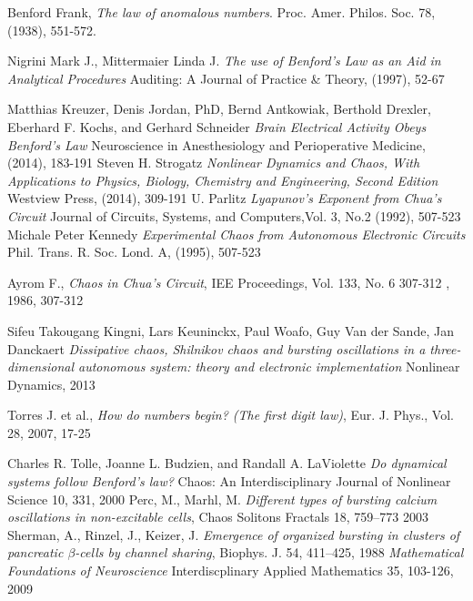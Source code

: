 \begin{thebibliography}{1}

  Benford Frank,
  \emph{The law of anomalous numbers}.
  Proc. Amer. Philos. Soc. 78,
  (1938),
  551-572.

  Nigrini Mark J., Mittermaier Linda J.
  \emph{The use of Benford's Law as an Aid in Analytical Procedures}
  Auditing: A Journal of Practice \& Theory,
  (1997),
  52-67

  Matthias Kreuzer, Denis Jordan, PhD, Bernd Antkowiak, Berthold Drexler, Eberhard F. Kochs, and Gerhard Schneider
  \emph{Brain Electrical Activity Obeys Benford's Law}
  Neuroscience in Anesthesiology and Perioperative Medicine,
  (2014),
  183-191
 Steven H. Strogatz
  \emph{Nonlinear Dynamics and Chaos, With Applications to Physics, Biology, Chemistry and Engineering, Second Edition}
  Westview Press,
  (2014),
  309-191
  U. Parlitz
  \emph{Lyapunov's Exponent from Chua's Circuit}
  Journal of Circuits, Systems, and Computers,Vol. 3, No.2
  (1992),
  507-523
  Michale Peter Kennedy
  \emph{Experimental Chaos from Autonomous Electronic Circuits}
  Phil. Trans. R. Soc. Lond. A,
  (1995),
  507-523

Ayrom F.,
 \emph{Chaos in Chua's Circuit},
 IEE Proceedings, Vol. 133, No. 6 307-312
 , 1986,
 307-312


Sifeu Takougang Kingni, Lars Keuninckx, Paul Woafo,  Guy Van der Sande, Jan Danckaert
\emph{Dissipative chaos, Shilnikov chaos and bursting oscillations
in a three-dimensional autonomous system: theory
and electronic implementation}
Nonlinear Dynamics,
2013

 Torres J. et al.,
 \emph{How do numbers begin? (The first digit law)},
  Eur. J. Phys., Vol. 28,
   2007,
   17-25

Charles R. Tolle, Joanne L. Budzien, and Randall A. LaViolette
\emph{Do dynamical systems follow Benford’s law?}
Chaos: An Interdisciplinary Journal of Nonlinear Science 10,
 331,
2000
Perc, M., Marhl, M.
\emph{ Different types of bursting calcium
oscillations in non-excitable cells},
Chaos Solitons Fractals 18,
 759–773
2003
Sherman, A., Rinzel, J., Keizer, J.
\emph{ Emergence of organized bursting in clusters of pancreatic $\beta$-cells by channel sharing},
Biophys. J. 54, 411–425,
1988
\emph{Mathematical Foundations of Neuroscience}
Interdiscplinary Applied Mathematics 35,
103-126,
2009
\end{thebibliography}

% 

